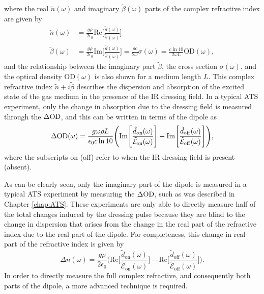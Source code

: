 where the real $\tilde{n}(\omega)$ and imaginary $\tilde{\beta}(\omega)$ parts of the complex refractive index are given by
\begin{equation}
	\begin{aligned}
		\tilde{n}(\omega) &= \frac{g \rho}{2 \epsilon_0} \mathrm{Re}\Bigg[ \frac{\tilde{d}(\omega)}{\tilde{\mathcal{E}}(\omega)} \Bigg]\\
		\tilde{\beta}(\omega) &= \frac{g \rho}{2\epsilon_0} \mathrm{Im}\Bigg[ \frac{\tilde{d}(\omega)}{\tilde{\mathcal{E}}(\omega)} \Bigg] = \frac{\rho c}{2\omega}\sigma(\omega) = \frac{c \ln 10}{2\omega L} \mathrm{OD}(\omega),
	\end{aligned}
\end{equation}
and the relationship between the imaginary part $\tilde{\beta}$, the cross section $\sigma(\omega)$, and the optical density $\mathrm{OD}(\omega)$ is also shown for a medium length $L$.  This complex refractive index $\tilde{n} + i\tilde{\beta}$ describes the dispersion and absorption of the excited state of the gas medium in the presence of the IR dressing field.  In a typical ATS experiment, only the change in absorption due to the dressing field is measured through the $\Delta\mathrm{OD}$, and this can be written in terms of the dipole as 
\begin{equation}
	\label{eqn:dod_im_dipole}
	\Delta\mathrm{OD}(\omega) = \frac{g \omega \rho L}{\epsilon_0 c \ln 10}\Bigg( \mathrm{Im}\Bigg[\frac{\tilde{d}_{\mathrm{on}}(\omega)}{\tilde{\mathcal{E}}_{\mathrm{on}}(\omega)}\Bigg] - \mathrm{Im}\Bigg[\frac{\tilde{d}_{\mathrm{off}}(\omega)}{\tilde{\mathcal{E}}_{\mathrm{off}}(\omega)}\Bigg] \Bigg),
\end{equation}
where the subscripts on (off) refer to when the IR dressing field is present (absent).

As can be clearly seen, only the imaginary part of the dipole is measured in a typical ATS experiment by measuring the $\Delta\mathrm{OD}$, such as was described in Chapter \ref{chap:ATS}.  These experiments are only able to directly measure half of the total changes induced by the dressing pulse because they are blind to the change in dispersion that arises from the change in the real part of the refractive index due to the real part of the dipole.  For completeness, this change in real part of the refractive index is given by 
\begin{equation}
	\label{eqn:dn_re_dipole}
	\Delta n(\omega) = \frac{g\rho}{2 \epsilon_0} \Bigg( \mathrm{Re}\Bigg[\frac{\tilde{d}_{\mathrm{on}}(\omega)}{\tilde{\mathcal{E}}_{\mathrm{on}}(\omega)}\Bigg] - \mathrm{Re}\Bigg[\frac{\tilde{d}_{\mathrm{off}}(\omega)}{\tilde{\mathcal{E}}_{\mathrm{off}}(\omega)}\Bigg] 
	\Bigg).
\end{equation}
In order to directly measure the full complex refractive, and consequently both parts of the dipole, a more advanced technique is required. 


